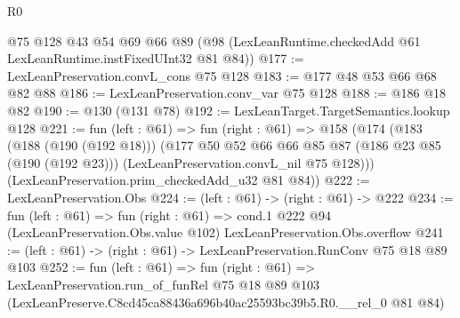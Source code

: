\begin{lexlean}{R0}
\begin{coremodule}
    @75
    @128
    @43
    @54
    @69
    @66
    @89
    (@98 (LexLeanRuntime.checkedAdd @61 LexLeanRuntime.instFixedUInt32 @81 @84))
@177 := LexLeanPreservation.convL_cons @75 @128
@183 := @177 @48 @53 @66 @68 @82 @88
@186 := LexLeanPreservation.conv_var @75 @128
@188 := @186 @18 @82
@190 := @130 (@131 @78)
@192 := LexLeanTarget.TargetSemantics.lookup @128
@221 := fun (left : @61) =>
  fun (right : @61) =>
  @158
    (@174
      (@183
        (@188 (@190 (@192 @18)))
        (@177
          @50
          @52
          @66
          @66
          @85
          @87
          (@186 @23 @85 (@190 (@192 @23)))
          (LexLeanPreservation.convL_nil @75 @128)))
      (LexLeanPreservation.prim_checkedAdd_u32 @81 @84))
@222 := LexLeanPreservation.Obs
@224 := (left : @61) -> (right : @61) -> @222
@234 := fun (left : @61) =>
  fun (right : @61) =>
  cond.{1} @222 @94 (LexLeanPreservation.Obs.value @102) LexLeanPreservation.Obs.overflow
@241 := (left : @61) -> (right : @61) -> LexLeanPreservation.RunConv @75 @18 @89 @103
@252 := fun (left : @61) =>
  fun (right : @61) =>
  LexLeanPreservation.run_of_funRel
    @75
    @18
    @89
    @103
    (LexLeanPreserve.C8cd45ca88436a696b40ac25593bc39b5.R0.__rel_0 @81 @84)
\end{coremodule}
\end{lexlean}
